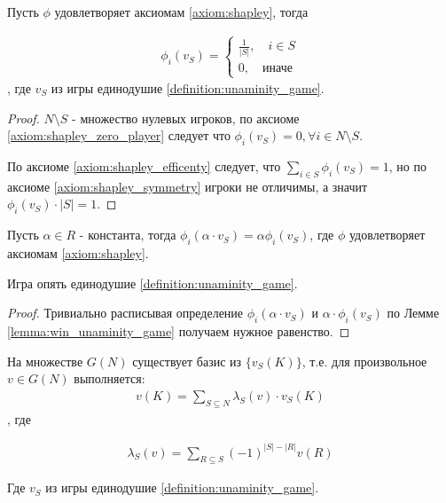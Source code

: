 \documentclass[../main.tex]{subfiles}
\begin{document}
\begin{lm} \label{lemma:win_unaminity_game}
	Пусть $\phi $ удовлетворяет аксиомам \ref{axiom:shapley}, тогда 

	\begin{align*}
		\phi_i(v_S) = \begin{cases} 
			\frac{1}{|S|}, \quad i \in S \\
			0, \quad \text{иначе}
		\end{cases}
	\end{align*}, где $v_S$ из игры единодушие \ref{definition:unaminity_game}.

\end{lm}

\begin{proof}
	$N \setminus S$ - множество нулевых игроков, по аксиоме \eqref{axiom:shapley_zero_player} следует что  $\phi_i(v_S) = 0, \forall i \in N \setminus S$.

	По аксиоме \eqref{axiom:shapley_efficenty} следует, что  $\sum_{i \in S} \phi_i(v_S) = 1$, но по аксиоме \eqref{axiom:shapley_symmetry} игроки не отличимы, а значит  $\phi_i(v_S) \cdot |S| = 1$.
\end{proof}

\begin{lm} \label{lemma:uniformity_unaminity_game}
	Пусть $\alpha \in R$ - константа, тогда  $\phi_i(\alpha \cdot v_S) = \alpha \phi_i(v_S)$, где $\phi$ удовлетворяет аксиомам \ref{axiom:shapley}.

	Игра опять единодушие \ref{definition:unaminity_game}.
\end{lm}

\begin{proof}
	Тривиально расписывая определение $\phi_i(\alpha \cdot v_S)$ и  $\alpha \cdot \phi_i(v_S)$ по Лемме \ref{lemma:win_unaminity_game} получаем нужное равенство.
\end{proof}

\begin{lm} \label{lemma:basis_to_unaminity_game}
	На множестве $G(N)$ существует базис из  $\{v_S(K)\}$, т.е. для произвольное $v \in G(N)$ выполняется:
	\begin{align*}
		v(K) = \sum_{S \subseteq N} \lambda_S(v) \cdot v_S(K)
	\end{align*}, где 

	\begin{align*}
		\lambda_S(v) = \sum_{R \subseteq S} (-1)^{|S| - |R|} v(R)
	\end{align*}

	Где $v_S$ из игры единодушие \ref{definition:unaminity_game}.

\end{lm}
\end{document}
